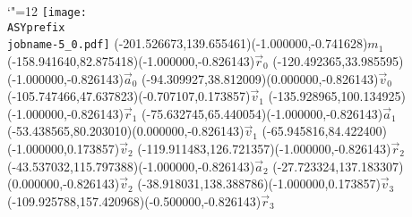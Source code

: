 \setlength{\unitlength}{1pt}
\makeatletter%
\let\ASYencoding\f@encoding%
\let\ASYfamily\f@family%
\let\ASYseries\f@series%
\let\ASYshape\f@shape%
\makeatother%
{\catcode`"=12%
\texttt{[image: \\ASYprefix\\jobname-5\_0.pdf]}%
}%
\color{ASYcolor}
\fontsize{12.000000}{14.400000}\selectfont
\usefont{\ASYencoding}{\ASYfamily}{\ASYseries}{\ASYshape}%
\ASYalign(-201.526673,139.655461)(-1.000000,-0.741628){$m_1$}%
\color{ASYcolor}
\fontsize{12.000000}{14.400000}\selectfont
\ASYalign(-158.941640,82.875418)(-1.000000,-0.826143){$\vec{r}_0$}%
\color{ASYcolor}
\fontsize{12.000000}{14.400000}\selectfont
\ASYalign(-120.492365,33.985595)(-1.000000,-0.826143){$\vec{a}_0$}%
\color{ASYcolor}
\fontsize{12.000000}{14.400000}\selectfont
\ASYalign(-94.309927,38.812009)(0.000000,-0.826143){$\vec{v}_0$}%
\color{ASYcolor}
\fontsize{12.000000}{14.400000}\selectfont
\ASYalign(-105.747466,47.637823)(-0.707107,0.173857){$\vec{v}_1$}%
\color{ASYcolor}
\fontsize{12.000000}{14.400000}\selectfont
\ASYalign(-135.928965,100.134925)(-1.000000,-0.826143){$\vec{r}_1$}%
\color{ASYcolor}
\fontsize{12.000000}{14.400000}\selectfont
\ASYalign(-75.632745,65.440054)(-1.000000,-0.826143){$\vec{a}_1$}%
\color{ASYcolor}
\fontsize{12.000000}{14.400000}\selectfont
\ASYalign(-53.438565,80.203010)(0.000000,-0.826143){$\vec{v}_1$}%
\color{ASYcolor}
\fontsize{12.000000}{14.400000}\selectfont
\ASYalign(-65.945816,84.422400)(-1.000000,0.173857){$\vec{v}_2$}%
\color{ASYcolor}
\fontsize{12.000000}{14.400000}\selectfont
\ASYalign(-119.911483,126.721357)(-1.000000,-0.826143){$\vec{r}_2$}%
\color{ASYcolor}
\fontsize{12.000000}{14.400000}\selectfont
\ASYalign(-43.537032,115.797388)(-1.000000,-0.826143){$\vec{a}_2$}%
\color{ASYcolor}
\fontsize{12.000000}{14.400000}\selectfont
\ASYalign(-27.723324,137.183307)(0.000000,-0.826143){$\vec{v}_2$}%
\color{ASYcolor}
\fontsize{12.000000}{14.400000}\selectfont
\ASYalign(-38.918031,138.388786)(-1.000000,0.173857){$\vec{v}_3$}%
\color{ASYcolor}
\fontsize{12.000000}{14.400000}\selectfont
\ASYalign(-109.925788,157.420968)(-0.500000,-0.826143){$\vec{r}_3$}%
